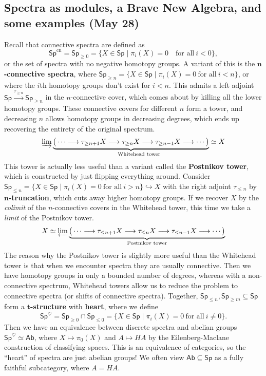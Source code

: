 \subsection{Spectra as modules, a Brave New Algebra, and some examples (May 28)}
Recall that connective spectra are defined as \[
    \mathsf{Sp} ^{\mathrm{cn}}= \mathsf{Sp} _{\geq 0}= \{X \in \mathsf{Sp} \mid \pi_i (X) =0 \quad \text{for all} \ i <0\} ,
\] or the set of spectra with no negative homotopy groups. A variant of this is the $\mathbf n$\textbf{-connective spectra}, where $\mathsf{Sp} _{\geq n}= \{X \in \mathsf{Sp} \mid \pi_i (X)=0 \ \text{for all} \ i <n\} $, or where the $i$th homotopy groups don't exist for $i<n$. This admits a left adjoint $\mathsf{Sp} \xrightarrow{\tau _{\geq n}} \mathsf{Sp} _{\geq n}$ in the $n$-connective cover, which comes about by killing all the lower homotopy groups. These connective covers for different $n$ form a tower, and decreasing $n$ allows homotopy groups in decreasing degrees, which ends up recovering the entirety of the original spectrum. \[
\varinjlim \underset{\text{Whitehead tower} }{\underbrace{\big( \cdots \longrightarrow\tau _{\geq n+1}X \longrightarrow\tau _{\geq n}X\longrightarrow\tau _{\geq n-1}X\longrightarrow\cdots \big)} \simeq  X
} \] This tower is actually less useful than a variant called the \textbf{Postnikov tower}, which is constructed by just flipping everything around. Consider $\mathsf{Sp} _{\leq n}= \{X \in \mathsf{Sp} \mid \pi _i (X) =0 \ \text{for all} \ i>n\} \hookrightarrow X$ with the right adjoint $\tau _{\leq n}$ by $\mathbf n$\textbf{-truncation}, which cuts away higher homotopy groups. If we recover $X$ by the \emph{colimit} of the $n$-connective covers in the Whitehead tower, this time we take a \emph{limit} of the Postnikov tower. \[
X \simeq \varprojlim \underset{\text{Postnikov tower} }{\underbrace{\big( \cdots \longrightarrow \tau_{\leq n+1}X \longrightarrow \tau_{\leq n}X\longrightarrow \tau_{\leq n-1}X\longrightarrow\cdots \big)}
} \] The reason why the Postnikov tower is slightly more useful than the Whitehead tower is that when we encounter spectra they are usually connective. Then we have homotopy groups in only a bounded number of degrees, whereas with a non-connective spectrum, Whitehead towers allow us to reduce the problem to connective spectra (or shifts of connective spectra).
Together, $\mathsf{Sp} _{\leq n},\mathsf{Sp} _{\geq m}\subseteq \mathsf{Sp} $ form a $\mathbf t$\textbf{-structure} with \textbf{heart}, where we define 
\[
\mathsf{Sp} ^{\heartsuit}=\mathsf{Sp} _{\geq 0}\cap \mathsf{Sp} _{\leq 0}=\{X \in \mathsf{Sp} \mid \pi _i (X)=0 \ \text{for all} \ i \neq 0\} .
\] Then we have an equivalence between discrete spectra and abelian groups $\mathsf{Sp} ^{\heartsuit}\simeq  \mathsf{Ab} $, where $X \mapsto \pi_0(X)$ and $A \mapsto HA$ by the Eilenberg-Maclane construction of classifying spaces. This is an equivalence of categories, so the ``heart'' of spectra are just abelian groups! We often view $\mathsf{Ab} \subseteq \mathsf{Sp} $ as a fully faithful subcategory, where $A=HA$.

